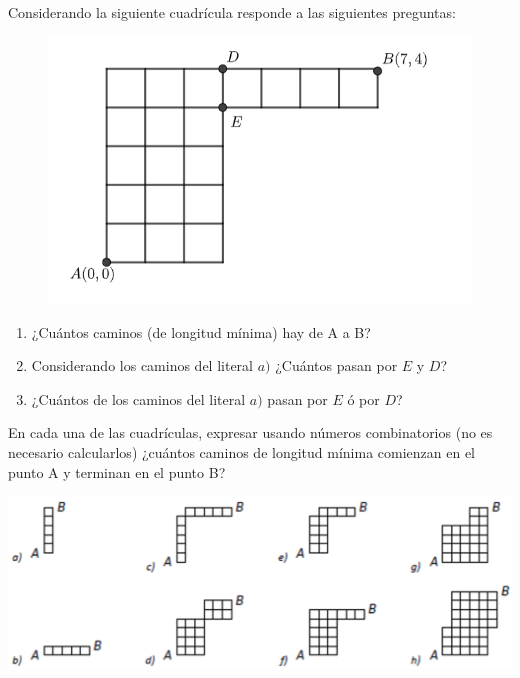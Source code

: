 \begin{problema}
    Considerando la siguiente cuadrícula responde a las siguientes preguntas:

    \begin{figure}[H]
        \centering
        \includegraphics[scale=0.6]{Imagenes/IMG3/Cuadricula_1.png}
    \end{figure}

    \renewcommand{\theenumi}{\alph{enumi})}
    \begin{enumerate}
        \item ¿Cuántos caminos (de longitud mínima) hay de A a B?

        \item Considerando los caminos del literal $a)$ ¿Cuántos pasan por $E$ y $D$?

        \item ¿Cuántos de los caminos del literal $a)$ pasan por $E$ ó por $D$?
    \end{enumerate}
    
\end{problema}
\renewcommand{\theenumi}{\arabic{enumi}}




\begin{problema}
    En cada una de las cuadrículas, expresar usando números combinatorios (no es necesario calcularlos) ¿cuántos caminos de longitud mínima comienzan en el punto A y terminan en el punto B?

    \begin{center}
        \includegraphics[scale=0.6]{Imagenes/IMG3/Caminos3.png}
    \end{center}
    
\end{problema}

